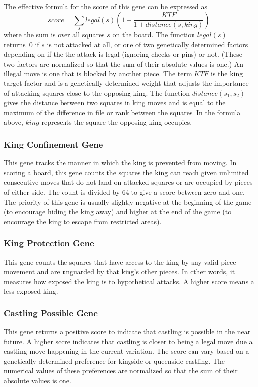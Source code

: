 \documentclass[letterpaper]{article}
\renewcommand{\_}{\allowbreak\textunderscore\allowbreak}
\begin{document}
The effective formula for the score of this gene can be expressed as
\[score = \sum_s legal(s)\left(1+\frac{KTF}{1+distance(s,king)}\right)\]
where the sum is over all squares \(s\) on the board. The function \(legal(s)\) returns~0 if \(s\) is not attacked at all, or one of two genetically determined factors depending on if the the attack is legal (ignoring checks or pins) or not. (These two factors are normalized so that the sum of their absolute values is one.) An illegal move is one that is blocked by another piece. The term \(KTF\) is the king target factor and is a genetically determined weight that adjusts the importance of attacking squares close to the opposing king. The function \(distance(s_1, s_2)\) gives the distance between two squares in king moves and is equal to the maximum of the difference in file or rank between the squares. In the formula above, \(king\) represents the square the opposing king occupies.

\subsubsection{King Confinement Gene}
This gene tracks the manner in which the king is prevented from moving. In scoring a board, this gene counts the squares the king can reach given unlimited consecutive moves that do not land on attacked squares or are occupied by pieces of either side. The count is divided by 64 to give a score between zero and one. The priority of this gene is usually slightly negative at the beginning of the game (to encourage hiding the king away) and higher at the end of the game (to encourage the king to escape from restricted areas).

\subsubsection{King Protection Gene}
This gene counts the squares that have access to the king by any valid piece movement and are unguarded by that king's other pieces. In other words, it measures how exposed the king is to hypothetical attacks. A higher score means a less exposed king.

\subsubsection{Castling Possible Gene}
This gene returns a positive score to indicate that castling is possible in the near future. A higher score indicates that castling is closer to being a legal move due a castling move happening in the current variation. The score can vary based on a genetically determined preference for kingside or queenside castling. The numerical values of these preferences are normalized so that the sum of their absolute values is one.
\end{document}
